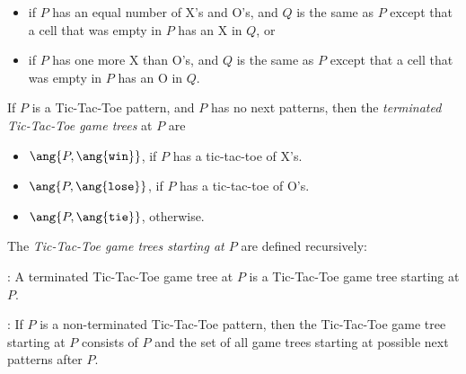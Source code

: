 \begin{definition}
\begin{definition}
\begin{itemize}
\item if $P$ has an equal number of X's and O's, and $Q$ is the same as
$P$ except that a cell that was empty in $P$ has an X in $Q$, or

\item if $P$ has one more X than O's, and $Q$ is the same as $P$ except
that a cell that was empty in $P$ has an O in $Q$.
\end{itemize}

If $P$ is a Tic-Tac-Toe pattern, and $P$ has no next patterns, then the
\emph{terminated Tic-Tac-Toe game trees} at $P$ are

\begin{itemize}

\item 
$\ang{P, \ang{\texttt{win}}}$,
if $P$ has a tic-tac-toe of X's.


\item 
$\ang{P, \ang{\texttt{lose}}}$, if $P$ has a tic-tac-toe of O's.


\item $\ang{P, \ang{\texttt{tie}}}$, otherwise.

\end{itemize}

\iffalse
If $Q$ is a possible move from $P$, then the game tree starting at $Q$ is
called a \emph{  Notice
that $\mathcal{G}_P = \emptyset$ iff $P$ is terminated.}
\fi

The \emph{Tic-Tac-Toe game trees starting at $P$} are defined recursively:

:
A terminated Tic-Tac-Toe game tree at $P$ is a Tic-Tac-Toe game tree
starting at $P$.

: If $P$ is a non-terminated Tic-Tac-Toe pattern,
then the Tic-Tac-Toe game tree starting at $P$ consists of $P$ and the set
of all game trees starting at possible next patterns after $P$.
\end{definition}


\end{definition}

